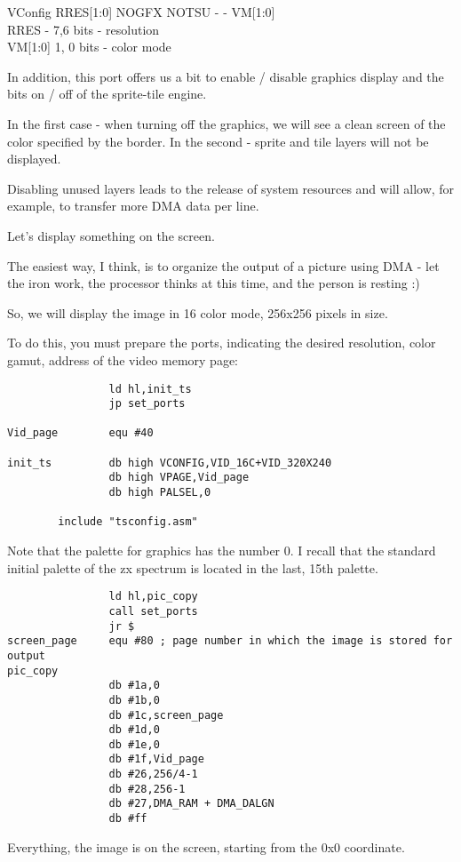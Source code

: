 VConfig RRES[1:0]               NOGFX   NOTSU   -       -       VM[1:0]\\
RRES - 7,6 bits - resolution\\
VM[1:0] 1, 0 bits - color mode

In addition, this port offers us a bit to enable / disable graphics
display and the bits on / off of the sprite-tile engine.

In the first case - when turning off the graphics, we will see a clean
screen of the color specified by the border. In the second - sprite
and tile layers will not be displayed.

Disabling unused layers leads to the release of system resources and
will allow, for example, to transfer more DMA data per line.

Let's display something on the screen.

The easiest way, I think, is to organize the output of a picture using
DMA - let the iron work, the processor thinks at this time, and the
person is resting :)

So, we will display the image in 16 color mode, 256x256 pixels in
size.

To do this, you must prepare the ports, indicating the desired
resolution, color gamut, address of the video memory page:
\begin{verbatim}
                ld hl,init_ts
                jp set_ports

Vid_page        equ #40

init_ts         db high VCONFIG,VID_16C+VID_320X240
                db high VPAGE,Vid_page
                db high PALSEL,0

        include "tsconfig.asm"
\end{verbatim}
Note that the palette for graphics has the number 0. I recall that the
standard initial palette of the zx spectrum is located in the last,
15th palette.
\begin{verbatim}
                ld hl,pic_copy
                call set_ports
                jr $
screen_page     equ #80 ; page number in which the image is stored for output
pic_copy
                db #1a,0
                db #1b,0
                db #1c,screen_page
                db #1d,0
                db #1e,0
                db #1f,Vid_page
                db #26,256/4-1
                db #28,256-1
                db #27,DMA_RAM + DMA_DALGN
                db #ff
\end{verbatim}
Everything, the image is on the screen, starting from the 0x0
coordinate.

